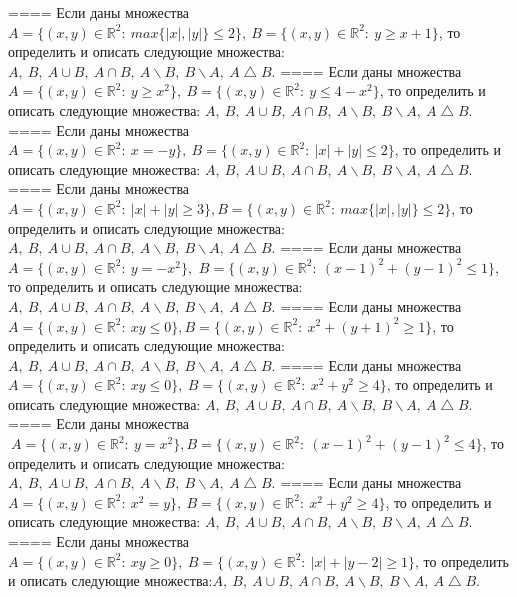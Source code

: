 ====
Если даны множества \(A = \{(x,y) \in \mathbb{R}^{2}:\ max\{|x|,|y|\} \leq 2\},\ B = \{(x,y) \in \mathbb{R}^{2}:\ y \geq x + 1\}\), то определить и описать следующие множества: \(A,\ B,\ A \cup B,\ A \cap B,\ A \backslash B,\ B \backslash A,\ A \bigtriangleup B\).
====
Если даны множества \(A = \{(x,y) \in \mathbb{R}^{2}:\ y \geq x^{2}\},\ B = \{(x,y) \in \mathbb{R}^{2}:\ y \leq 4 - x^{2}\}\), то определить и описать следующие множества: \(A,\ B,\ A \cup B,\ A \cap B,\ A \backslash B,\ B \backslash A,\ A \bigtriangleup B\).
====
Если даны множества \(A = \{(x,y) \in \mathbb{R}^{2}:\ x = - y\},\ B = \{(x,y) \in \mathbb{R}^{2}:\ |x| + |y| \leq 2\}\), то определить и описать следующие множества: \(A,\ B,\ A \cup B,\ A \cap B,\ A \backslash B,\ B \backslash A,\ A \bigtriangleup B\).
====
Если даны множества \(A = \{(x,y) \in \mathbb{R}^{2}:\ |x| + |y| \geq 3\},B = \{(x,y) \in \mathbb{R}^{2}:\ max\{|x|,|y|\} \leq 2\}\), то определить и описать следующие множества: \(A,\ B,\ A \cup B,\ A \cap B,\ A \backslash B,\ B \backslash A,\ A \bigtriangleup B\).
====
Если даны множества \(A = \{(x,y) \in \mathbb{R}^{2}:\ y = - x^{2}\},\) \(B = \{(x,y) \in \mathbb{R}^{2}:\ (x - 1)^{2} + (y - 1)^{2} \leq 1\}\), то определить и описать следующие множества: \(A,\ B,\ A \cup B,\ A \cap B,\ A \backslash B,\ B \backslash A,\ A \bigtriangleup B\).
====
Если даны множества \(A = \{(x,y) \in \mathbb{R}^{2}:\ xy \leq 0\},B = \{(x,y) \in \mathbb{R}^{2}:\ x^{2} + (y + 1)^{2} \geq 1\}\), то определить и описать следующие множества: \(A,\ B,\ A \cup B,\ A \cap B,\ A \backslash B,\ B \backslash A,\ A \bigtriangleup B\).
====
Если даны множества \(A = \{(x,y) \in \mathbb{R}^{2}:\ xy \leq 0\},\ B = \{(x,y) \in \mathbb{R}^{2}:\ x^{2} + y^{2} \geq 4\}\), то определить и описать следующие множества: \(A,\ B,\ A \cup B,\ A \cap B,\ A \backslash B,\ B \backslash A,\ A \bigtriangleup B\).
====
Если даны множества\(\ A = \{(x,y) \in \mathbb{R}^{2}:\ y = x^{2}\},B = \{(x,y) \in \mathbb{R}^{2}:\ (x - 1)^{2} + (y - 1)^{2} \leq 4\}\), то определить и описать следующие множества: \(A,\ B,\ A \cup B,\ A \cap B,\ A \backslash B,\ B \backslash A,\ A \bigtriangleup B\).
====
Если даны множества \(A = \{(x,y) \in \mathbb{R}^{2}:\ x^{2} = y\},\ B = \{(x,y) \in \mathbb{R}^{2}:\ x^{2} + y^{2} \geq 4\}\), то определить и описать следующие множества: \(A,\ B,\ A \cup B,\ A \cap B,\ A \backslash B,\ B \backslash A,\ A \bigtriangleup B\).
====
Если даны множества \(A = \{(x,y) \in \mathbb{R}^{2}:\ xy \geq 0\},\ B = \{(x,y) \in \mathbb{R}^{2}:\ |x| + |y - 2| \geq 1\}\), то определить и описать следующие множества:\(A,\ B,\ A \cup B,\ A \cap B,\ A \backslash B,\ B \backslash A,\ A \bigtriangleup B\).
